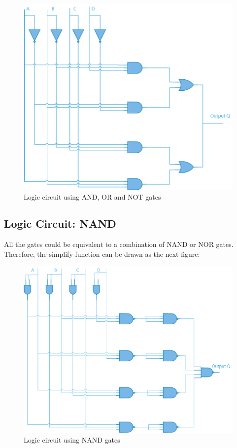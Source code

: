     \begin{figure}[htb!]
        \centering
        \includegraphics[scale=0.45]{E2TP1/normallogic.png}
        \caption{\color{cyan}Logic circuit using AND, OR and NOT gates}
        \label{fig:normllogic}
    \end{figure}
    
    \pagebreak

    \subsection{\color{purple}Logic Circuit: NAND}

    All the gates could be equivalent to a combination of NAND or NOR gates. Therefore, the simplify function can be drawn as the next figure:

    \begin{figure}[h!]
        \centering
        \includegraphics[scale=0.45]{E2TP1/nandlogic.png}
        \caption{\color{cyan}Logic circuit using NAND gates}
        \label{fig:nandlogic}
    \end{figure}